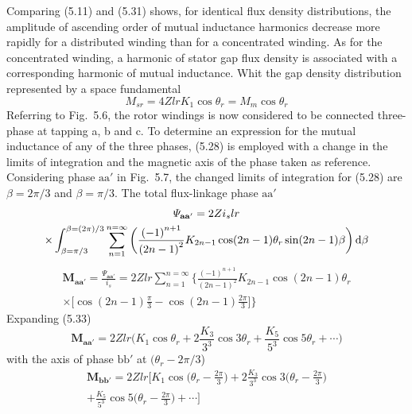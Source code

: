 \documentclass[a4paper,numbers=noenddot,12pt]{scrbook}
\begin{document}
Comparing (5.11) and (5.31) shows, for identical flux density distributions, the amplitude of ascending order of mutual inductance harmonics decrease more rapidly for a distributed winding than for a concentrated winding. As for the concentrated winding, a harmonic of stator gap flux density is associated with a corresponding harmonic of mutual inductance. Whit the gap density distribution represented by a space fundamental
\begin{equation}
    M_{sr} = 4Z l r K_1 \cos \theta_r = M_m \cos \theta_r
\end{equation}
Referring to Fig.\ 5.6, the rotor windings is now considered to be connected three-phase at tapping a, b and c. To determine an expression for the mutual inductance of any of the three phases, (5.28) is employed with a change in the limits of integration and the magnetic axis of the phase taken as reference. Considering phase $\textrm{aa}'$ in Fig.\ 5.7, the changed limits of integration for (5.28) are $\beta = 2\pi / 3$ and $\beta = \pi / 3$. The total flux-linkage phase $\textrm{aa}'$
\begin{multline*}
    \mathbf{\varPsi_{aa'}} = 2 Z i_s l r \\
    \times \int_{\beta = \pi / 3}^{\beta = (2 \pi)/3} \displaystyle \sum_{n = 1}^{n = \infty} \bigg( \frac{{(-1)}^{n+1}}{{(2n - 1)}^2}K_{2n-1} \cos(2n - 1) \theta_r \sin(2n - 1) \beta \bigg) \dif \beta \\
\end{multline*}
\begin{multline}
    \mathbf{M_{aa'}} = \frac{\mathbf{\varPsi_{aa'}}}{i_s} = 2 Z l r \displaystyle \sum_{n = 1}^{n = \infty}  \bigg \{\frac{{(-1)}^{n+1}}{{(2n -1)}^2} K_{2n - 1} \cos(2n - 1) \theta_r  \\
    \times \bigg[ \cos(2n - 1) \frac{\pi}{3}  - \cos(2n -1) \frac{2\pi}{3} \bigg] \bigg \}
\end{multline}
Expanding (5.33)
\begin{equation*}
    \mathbf{M_{aa'}} = 2 Z l r \bigg( K_1 \cos \theta_r + 2 \frac{K_3}{3^3} \cos 3 \theta_r + \frac{K_5}{5^3} \cos 5 \theta_r + \cdots \bigg)
\end{equation*}
with the axis of phase $\textrm{bb}'$ at $(\theta_r - 2\pi/3$)
\begin{multline} %
    \boldsymbol{M_\mathbf{bb'}} = 2 Z l r \bigg[ K_1 \cos \bigg(\theta_r - \frac{2 \pi}{3} \bigg) + 2 \frac{K_3}{3^3} \cos 3 \bigg(\theta_r - \frac{2 \pi}{3} \bigg) \\
    + \frac{K_5}{5^3} \cos 5 \bigg( \theta_r - \frac{2 \pi}{3} \bigg ) + \cdots \bigg]
\end{multline}
\end{document}

